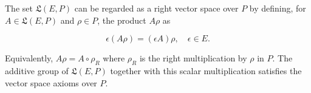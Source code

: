 The set $\mathfrak{L}(E, P)$ can be regarded as a right vector space over $P$ by defining, for $A \in \mathfrak{L}(E, P)$ and $\rho \in P$, the product $A\rho$ as

$$\epsilon(A\rho) = (\epsilon A)\rho, \quad \epsilon \in E.$$

Equivalently, $A\rho = A \circ \rho_R$ where $\rho_R$ is the right multiplication by $\rho$ in $P$. The additive group of $\mathfrak{L}(E, P)$ together with this scalar multiplication satisfies the vector space axioms over $P$.
